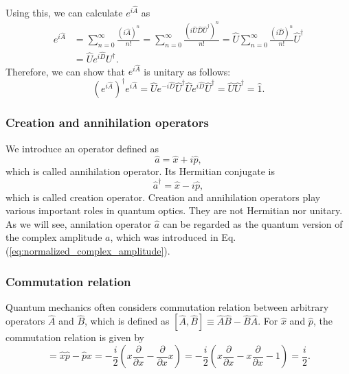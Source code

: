 Using this, we can calculate $e^{i\hat A}$ as 
\begin{equation}
\begin{aligned}
  e^{i\hat A} &= \sum_{n=0}^{\infty}\frac{\left(i\hat A\right)^n}{n!} 
  = \sum_{n=0}^{\infty}\frac{\left(i\hat U\hat D\hat U^\dagger\right)^n}{n!} = \hat U\sum_{n=0}^{\infty}\frac {(i\hat D)^n} {n!}\hat U^\dagger\\
  &= \hat U e^{i\hat D}U^\dagger.
\end{aligned}
\end{equation}
Therefore, we can show that $e^{i\hat A}$ is unitary as follows:
\begin{equation}
\left(e^{i\hat A}\right)^\dagger e^{i\hat A} = \hat U e^{-i\hat D}\hat U^\dagger \hat U e^{i\hat D}\hat U^\dagger = \hat U \hat U^\dagger = \hat 1.
\end{equation}

\subsubsection{Creation and annihilation operators}
We introduce an operator defined as
\begin{equation}
  \hat a = \hat x + i\hat p,
\end{equation}
which is called annihilation operator.
Its Hermitian conjugate is 
\begin{equation}
  \hat a^\dagger = \hat x - i\hat p,
\end{equation}
which is called creation operator.
Creation and annihilation operators play various important roles in quantum optics. They are not Hermitian nor unitary. As we will see, annilation operator $\hat a$ can be regarded as the quantum version of the complex amplitude $a$, which was introduced in Eq. (\ref{eq:normalized_complex_amplitude}).

\subsubsection{Commutation relation}
Quantum mechanics often considers commutation relation between arbitrary operators $\hat A$ and $\hat B$, which is defined as $[\hat A, \hat B]\equiv \hat A\hat B - \hat B \hat A$. For $\hat x$ and $\hat p$, the commutation relation is given by 
\begin{equation}
  [\hat x, \hat p] = \hat x\hat p- \hat p \hat x = -\frac{i}{2}\left(x\frac{\partial}{\partial x} -  \frac{\partial}{\partial x}x\right) = -\frac{i}{2}\left(x\frac{\partial}{\partial x} -  x\frac{\partial}{\partial x} - 1\right) = \frac i 2.
  \label{eq:commutation_x_p}
\end{equation}

